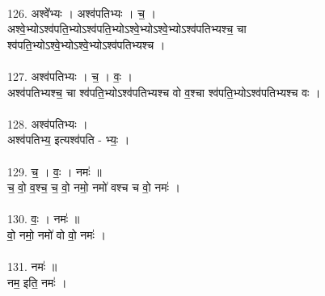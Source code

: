 \\
126. अश्वे᳚भ्यः । अश्व॑पतिभ्यः । च॒ ।\\
अश्वे॒भ्योऽश्व॑पति॒भ्योऽश्व॑पति॒भ्योऽश्वे॒भ्योऽश्वे॒भ्योऽश्व॑पतिभ्यश्च॒ चा\\
श्व॑पति॒भ्योऽश्वे॒भ्योऽश्वे॒भ्योऽश्व॑पतिभ्यश्च ।\\
\\
127. अश्व॑पतिभ्यः । च॒ । वः॒ ।\\
अश्व॑पतिभ्यश्च॒ चा श्व॑पति॒भ्योऽश्व॑पतिभ्यश्च वो व॒श्चा श्व॑पति॒भ्योऽश्व॑पतिभ्यश्च वः ।\\
\\
128. अश्व॑पतिभ्यः ।\\
अश्व॑पतिभ्य॒ इत्यश्व॑पति - भ्यः॒ ।\\
\\
129. च॒ । वः॒ । नमः॑ ॥\\
च॒ वो॒ व॒श्च॒ च॒ वो॒ नमो॒ नमो॑ वश्च च वो॒ नमः॑ ।\\
\\
130. वः॒ । नमः॑ ॥\\
वो॒ नमो॒ नमो॑ वो वो॒ नमः॑ ।\\
\\
131. नमः॑ ॥\\
नम॒ इति॒ नमः॑ ।\\
